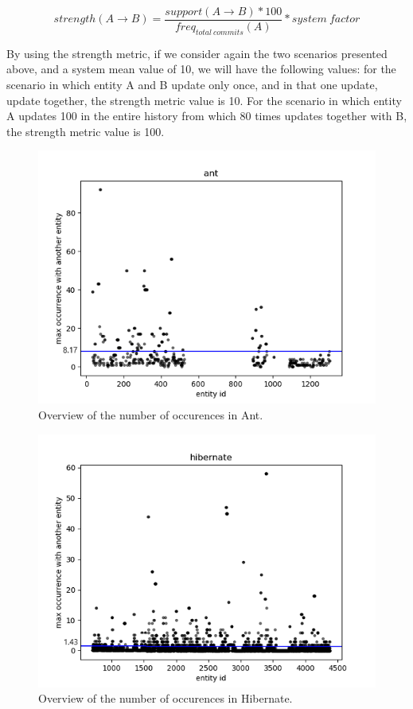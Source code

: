 \documentclass[runningheads]{comsis2}
\begin{document}
\begin{equation}
 strength (A \rightarrow B) =\frac{support (A \rightarrow B) * 100}{freq_{total\ commits}(A)} * system\ factor
\end{equation}

By using the strength metric, if we consider again the two scenarios presented above, and a system mean value of 10, we will have the following values: for the scenario in which entity A and B update only once, and in that one update, update together, the strength metric value is 10. For the scenario in which entity A updates 100 in the entire history from which 80 times updates together with B, the strength metric value is 100.  

\begin{figure}
\centering
\includegraphics[scale=0.7]{fig_ant_maxOcc.png}
\caption{Overview of the number of occurences in Ant. }
\label{fig:strength_overview_ant}
\centering
\end{figure}

\begin{figure}
\centering
\includegraphics[scale=0.7]{fig_hibernate_maxOcc.png}
\caption{Overview of the number of occurences in Hibernate. }
\label{fig:strength_overview_hibernate}
\centering
\end{figure}
\end{document}
